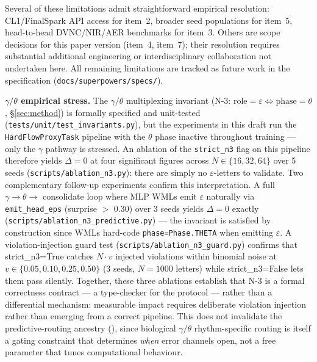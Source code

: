 \documentclass[10pt,twocolumn]{article}
\begin{document}
Several of these limitations admit straightforward empirical resolution: CL1/FinalSpark API access for item~2, broader seed populations for item~5, head-to-head DVNC/NIR/AER benchmarks for item~3. Others are scope decisions for this paper version (item~4, item~7); their resolution requires substantial additional engineering or interdisciplinary collaboration not undertaken here. All remaining limitations are tracked as future work in the specification (\texttt{docs/superpowers/specs/}).

\textbf{$\gamma/\theta$ empirical stress.} The $\gamma/\theta$ multiplexing
invariant (N-3: $\text{role}{=}\varepsilon \Leftrightarrow \text{phase}{=}\theta$,
\S\ref{sec:method}) is formally specified and unit-tested
(\texttt{tests/unit/test\_invariants.py}), but the experiments in this draft
run the \texttt{HardFlowProxyTask} pipeline with the $\theta$ phase inactive
throughout training --- only the $\gamma$ pathway is stressed. An ablation
of the \texttt{strict\_n3} flag on this pipeline therefore yields
$\Delta = 0$ at four significant figures across $N \in \{16, 32, 64\}$
over 5 seeds (\texttt{scripts/ablation\_n3.py}): there are simply no
$\varepsilon$-letters to validate. Two complementary follow-up experiments confirm this interpretation.
A full $\gamma \to \theta \to$ consolidate loop where MLP WMLs emit
$\varepsilon$ naturally via \texttt{emit\_head\_eps} (surprise $>$ 0.30)
over 3 seeds yields $\Delta = 0$ exactly
(\texttt{scripts/ablation\_n3\_predictive.py}) --- the invariant is
satisfied by construction since WMLs hard-code \texttt{phase=Phase.THETA}
when emitting $\varepsilon$. A violation-injection guard test
(\texttt{scripts/ablation\_n3\_guard.py}) confirms that strict\_n3=True
catches $N \cdot v$ injected violations within binomial noise at
$v \in \{0.05, 0.10, 0.25, 0.50\}$ (3 seeds, $N{=}1000$ letters)
while strict\_n3=False lets them pass silently. Together, these three
ablations establish that N-3 is a formal correctness contract --- a
type-checker for the protocol --- rather than a differential mechanism:
measurable impact requires deliberate violation injection rather than
emerging from a correct pipeline. This does not invalidate the predictive-routing ancestry
(\cite{bastos2012canonical, bastos2020routing, gabhart2025predictive}),
since biological $\gamma / \theta$ rhythm-specific routing is itself a
gating constraint that determines \emph{when} error channels open, not
a free parameter that tunes computational behaviour.
\end{document}
